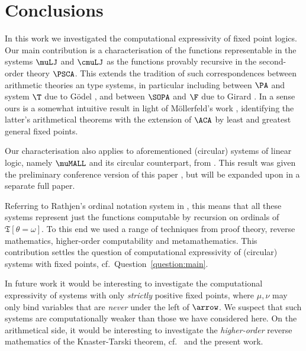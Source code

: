 \section{Conclusions}
\label{sec:concs}

In this work we investigated the computational expressivity of fixed point logics.
Our main contribution is a characterisation of the functions representable in the systems $\muLJ$ and $\cmuLJ$ as the functions provably recursive in the second-order theory $\PSCA$.
This extends the tradition of such correspondences between arithmetic theories an type systems, in particular including between $\PA$ and system $\T$ due to G\"odel \cite{goedel1958bisher}, and between $\SOPA$ and $\F$ due to Girard \cite{girard1972systemF}.
In a sense ours is a somewhat intuitive result in light of M\"ollerfeld's work \cite{Moellerfeld02:phd-thesis}, identifying the latter's arithmetical theorems with the extension of $\ACA$ by least and greatest general fixed points.


Our characterisation also applies to aforementioned (circular) systems of linear logic, namely $\muMALL$ and its circular counterpart, from \cite{BaeldeMiller07,Baelde12,BaeldeDS16Infinitaryprooftheory,EhrJaf21:cat-models-muLL,EhrJafSau21:totality-CmuMALL,BDKS22:bouncing-threads,DeSau19:infinets1,DePelSau:infinets2,DeJafSau22:phase-semantics}.
This result was given the preliminary conference version of this paper \cite{CD23:muLJ-lics}, but will be expanded upon in a separate full paper.


Referring to Rathjen's ordinal notation system in \cite{Rathjen95:recent-advances}, this means that all these systems represent just the functions computable by recursion on ordinals of $\mathfrak T[\theta = \omega]$.
To this end we used a range of techniques from proof theory, reverse mathematics, higher-order computability and metamathematics.
This contribution settles the question of computational expressivity of (circular) systems with fixed points, cf.~Question~\ref{question:main}.

In future work it would be interesting to investigate the computational expressivity of systems with only \emph{strictly} positive fixed points, where $\mu,\nu$ may only bind variables that are \emph{never} under the left of $\arrow$.
We suspect that such systems are computationally weaker than those we have considered here.
On the arithmetical side, it would be interesting to investigate the \emph{higher-order} reverse mathematics of the Knaster-Tarski theorem, cf.~\cite{SatoYamazaki17:rev-math-fixed-point-thms-with-kt} and the present work.

